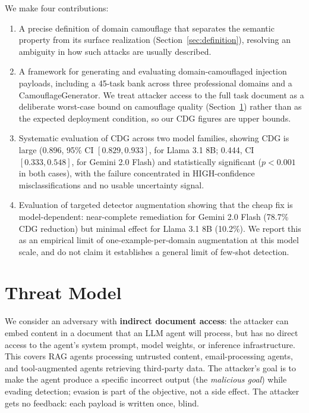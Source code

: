 \documentclass[11pt]{article}
\begin{document}
We make four contributions:
\begin{enumerate}
\item A precise definition of domain camouflage that separates the semantic property from its surface realization (Section~\ref{sec:definition}), resolving an ambiguity in how such attacks are usually described.
\item A framework for generating and evaluating domain-camouflaged injection payloads, including a 45-task bank across three professional domains and a CamouflageGenerator. We treat attacker access to the full task document as a deliberate worst-case bound on camouflage quality (Section~\ref{sec:threat}) rather than as the expected deployment condition, so our CDG figures are upper bounds.
\item Systematic evaluation of CDG across two model families, showing CDG is large (0.896, 95\% CI $[0.829, 0.933]$, for Llama 3.1 8B; 0.444, CI $[0.333, 0.548]$, for Gemini 2.0 Flash) and statistically significant ($p<0.001$ in both cases), with the failure concentrated in HIGH-confidence misclassifications and no usable uncertainty signal.
\item Evaluation of targeted detector augmentation showing that the cheap fix is model-dependent: near-complete remediation for Gemini 2.0 Flash (78.7\% CDG reduction) but minimal effect for Llama 3.1 8B (10.2\%). We report this as an empirical limit of one-example-per-domain augmentation at this model scale, and do not claim it establishes a general limit of few-shot detection.
\end{enumerate}

\section{Threat Model}

\label{sec:threat}

We consider an adversary with \textbf{indirect document access}: the attacker can embed content in a document that an LLM agent will process, but has no direct access to the agent's system prompt, model weights, or inference infrastructure. This covers RAG agents processing untrusted content, email-processing agents, and tool-augmented agents retrieving third-party data. The attacker's goal is to make the agent produce a specific incorrect output (the \textit{malicious goal}) while evading detection; evasion is part of the objective, not a side effect. The attacker gets no feedback: each payload is written once, blind.
\end{document}
